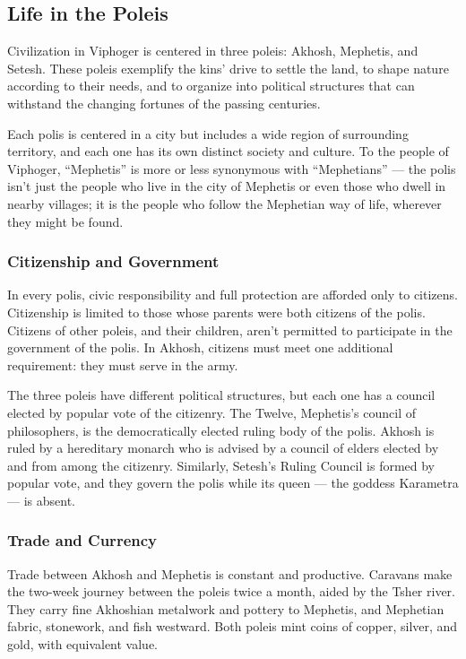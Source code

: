 \subsection*{Life in the Poleis} \label{ssec::lifeinthepoleis}
Civilization in Viphoger is centered in three poleis: Akhosh, Mephetis, and Setesh.
These poleis exemplify the kins' drive to settle the land, to shape nature according to their needs, and to organize into political structures that can withstand the changing fortunes of the passing centuries.

Each polis is centered in a city but includes a wide region of surrounding territory, and each one has its own distinct society and culture.
To the people of Viphoger, ``Mephetis'' is more or less synonymous with ``Mephetians'' --- the polis isn't just the people who live in the city of Mephetis or even those who dwell in nearby villages; it is the people who follow the Mephetian way of life, wherever they might be found.

\subsubsection{Citizenship and Government}
In every polis, civic responsibility and full protection are afforded only to citizens.
Citizenship is limited to those whose parents were both citizens of the polis.
Citizens of other poleis, and their children, aren't permitted to participate in the government of the polis.
In Akhosh, citizens must meet one additional requirement: they must serve in the army.

The three poleis have different political structures, but each one has a council elected by popular vote of the citizenry.
The Twelve, Mephetis's council of philosophers, is the democratically elected ruling body of the polis.
Akhosh is ruled by a hereditary monarch who is advised by a council of elders elected by and from among the citizenry.
Similarly, Setesh's Ruling Council is formed by popular vote, and they govern the polis while its queen --- the goddess Karametra --- is absent.

\subsubsection{Trade and Currency}
Trade between Akhosh and Mephetis is constant and productive.
Caravans make the two-week journey between the poleis twice a month, aided by the Tsher river.
They carry fine Akhoshian metalwork and pottery to Mephetis, and Mephetian fabric, stonework, and fish westward.
Both poleis mint coins of copper, silver, and gold, with equivalent value.

